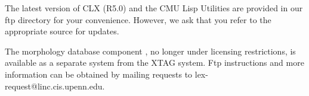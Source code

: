 The latest version of CLX (R5.0) and the CMU Lisp Utilities are provided in our
ftp directory for your convenience.  However, we ask that you refer to the
appropriate source for updates.

The morphology database component \cite{karp92}, no longer under licensing
restrictions, is available as a separate system from the XTAG system.  Ftp
instructions and more information can be obtained by mailing requests to
lex-request@linc.cis.upenn.edu.



